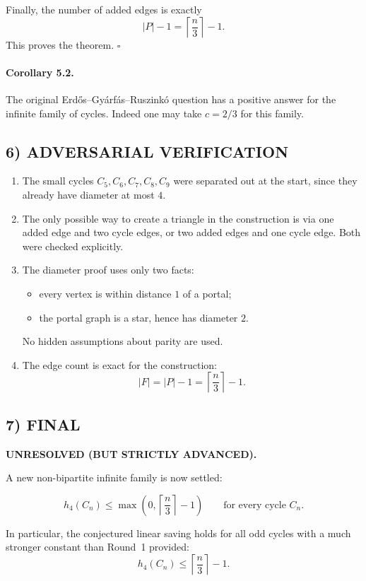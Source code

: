 Finally, the number of added edges is exactly
\[
|P|-1=\left\lceil \frac n3\right\rceil -1.
\]
This proves the theorem.
\hfill $\square$

\paragraph{Corollary 5.2.}
The original Erd\H{o}s--Gy\'arf\'as--Ruszink\'o question has a positive answer for the infinite family of cycles. Indeed one may take $c=2/3$ for this family.

\subsection*{6) ADVERSARIAL VERIFICATION}

\begin{enumerate}
\item The small cycles $C_5,C_6,C_7,C_8,C_9$ were separated out at the start, since they already have diameter at most $4$.
\item The only possible way to create a triangle in the construction is via one added edge and two cycle edges, or two added edges and one cycle edge. Both were checked explicitly.
\item The diameter proof uses only two facts:
\begin{itemize}
\item every vertex is within distance $1$ of a portal;
\item the portal graph is a star, hence has diameter $2$.
\end{itemize}
No hidden assumptions about parity are used.
\item The edge count is exact for the construction:
\[
|F|=|P|-1=\left\lceil \frac n3\right\rceil -1.
\]
\end{enumerate}

\subsection*{7) FINAL}

\textbf{UNRESOLVED (BUT STRICTLY ADVANCED).}

A new non-bipartite infinite family is now settled:

\[
h_4(C_n)\le \max\left(0,\left\lceil \frac n3\right\rceil -1\right)
\qquad\text{for every cycle } C_n.
\]

In particular, the conjectured linear saving holds for all odd cycles with a much stronger constant than Round~1 provided:
\[
h_4(C_n)\le \left\lceil \frac n3\right\rceil -1.
\]

